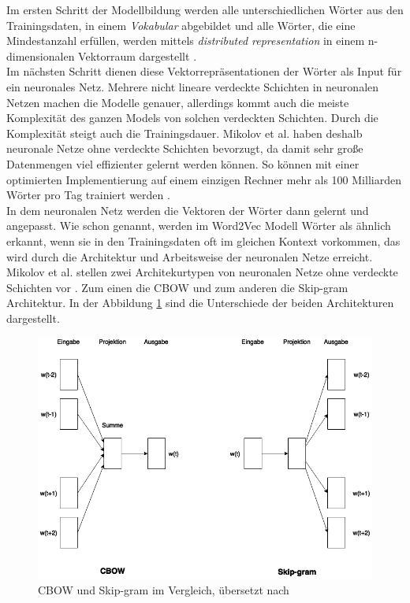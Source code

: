 \documentclass[12pt,a4paper]{report}
\begin{document}
Im ersten Schritt der Modellbildung werden alle unterschiedlichen Wörter aus den Trainingsdaten, in einem \textit{Vokabular} abgebildet und alle Wörter, die eine Mindestanzahl erfüllen, werden mittels \textit{distributed representation} in einem n-dimensionalen Vektorraum dargestellt \cite{DBLP:journals/corr/abs-1301-3781}.\\ 
Im nächsten Schritt dienen diese Vektorrepräsentationen der Wörter als Input für ein  neuronales Netz. Mehrere nicht lineare verdeckte Schichten in neuronalen Netzen machen die Modelle genauer, allerdings kommt auch die meiste Komplexität des ganzen Models von solchen verdeckten Schichten. Durch die Komplexität steigt auch die Trainingsdauer. Mikolov et al. \citep{DBLP:journals/corr/abs-1301-3781} haben deshalb neuronale Netze ohne verdeckte Schichten bevorzugt, da damit sehr große Datenmengen viel effizienter gelernt werden können. So können mit einer optimierten Implementierung auf einem einzigen Rechner mehr als 100 Milliarden Wörter pro Tag trainiert werden \cite{DBLP:journals/corr/MikolovSCCD13}. \\
In dem neuronalen Netz werden die Vektoren der Wörter dann gelernt und angepasst. Wie schon genannt, werden im Word2Vec Modell Wörter als ähnlich erkannt, wenn sie in den Trainingsdaten oft im gleichen Kontext vorkommen, das wird durch die Architektur und Arbeitsweise der neuronalen Netze erreicht. Mikolov et al. stellen zwei Architekurtypen von neuronalen Netze ohne verdeckte Schichten vor \citep{DBLP:journals/corr/abs-1301-3781}. Zum einen die CBOW und zum anderen die Skip-gram Architektur. In der Abbildung \ref{cbowvsskipgram} sind die Unterschiede der beiden Architekturen dargestellt.\\


\begin{figure}[h]
  \begin{center}
	\includegraphics[scale=0.55]{CBOWvsSkip-gram.png}
  \end{center}  
  \caption{CBOW und Skip-gram im Vergleich, übersetzt nach \cite{DBLP:journals/corr/abs-1301-3781}}
  \label{cbowvsskipgram}
\end{figure}
\end{document}
